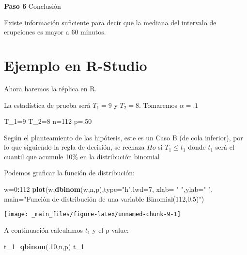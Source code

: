 \documentclass[a4paper,oneside,openany]{book}
\newenvironment{Shaded}{\begin{snugshade}}{\end{snugshade}}
\newcommand{\KeywordTok}[1]{\textcolor[rgb]{0.13,0.29,0.53}{\textbf{#1}}}
\newcommand{\DataTypeTok}[1]{\textcolor[rgb]{0.13,0.29,0.53}{#1}}
\newcommand{\DecValTok}[1]{\textcolor[rgb]{0.00,0.00,0.81}{#1}}
\newcommand{\StringTok}[1]{\textcolor[rgb]{0.31,0.60,0.02}{#1}}
\newcommand{\OperatorTok}[1]{\textcolor[rgb]{0.81,0.36,0.00}{\textbf{#1}}}
\newcommand{\NormalTok}[1]{#1}
\begin{document}
\textbf{Paso 6} Conclusión

Existe información suficiente para decir que la mediana del intervalo de
erupciones es mayor a 60 minutos.

\section{Ejemplo en R-Studio}\label{ejemplo-en-r-studio-1}

Ahora haremos la réplica en R.

La estadística de prueba será \(T_1=9\) y \(T_2=8\). Tomaremos
\(\alpha=.1\)

\begin{Shaded}
\begin{Highlighting}[]
\NormalTok{T_}\DecValTok{1}\NormalTok{=}\DecValTok{9}
\NormalTok{T_}\DecValTok{2}\NormalTok{=}\DecValTok{8}
\NormalTok{n=}\DecValTok{112}
\NormalTok{p=.}\DecValTok{50}
\end{Highlighting}
\end{Shaded}

Según el planteamiento de las hipótesis, este es un Caso B (de cola
inferior), por lo que siguiendo la regla de decisión, se rechaza \(Ho\)
si \(T_1\leq t_1\) donde \(t_1\) será el cuantil que acumule 10\% en la
distribución binomial

Podemos graficar la función de distribución:

\begin{Shaded}
\begin{Highlighting}[]
\NormalTok{w=}\DecValTok{0}\OperatorTok{:}\DecValTok{112}
\KeywordTok{plot}\NormalTok{(w,}\KeywordTok{dbinom}\NormalTok{(w,n,p),}\DataTypeTok{type=}\StringTok{"h"}\NormalTok{,}\DataTypeTok{lwd=}\DecValTok{7}\NormalTok{, }\DataTypeTok{xlab=} \StringTok{" "}\NormalTok{,}\DataTypeTok{ylab=}\StringTok{" "}\NormalTok{, }\DataTypeTok{main=}\StringTok{"Función de distribución de una }
\StringTok{   variable Binomial(112,0.5)"}\NormalTok{)}
\end{Highlighting}
\end{Shaded}

\begin{center}\texttt{[image: \_main\_files/figure-latex/unnamed-chunk-9-1]} \end{center}

A continuación calculamos \(t_1\) y el p-value:

\begin{Shaded}
\begin{Highlighting}[]
\NormalTok{t_}\DecValTok{1}\NormalTok{=}\KeywordTok{qbinom}\NormalTok{(.}\DecValTok{10}\NormalTok{,n,p)}
\NormalTok{t_}\DecValTok{1}
\end{Highlighting}
\end{Shaded}
\end{document}
